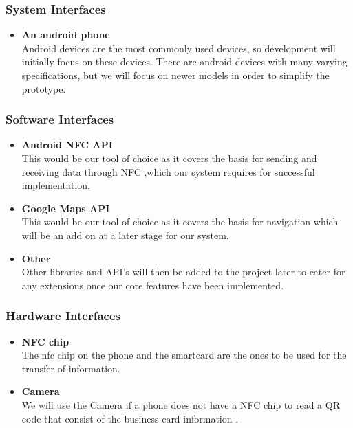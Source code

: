 \documentclass[english]{article}
\begin{document}
                                              \subsubsection{System Interfaces}
							\begin{itemize}
    						    \item \textbf{An android phone } \\
    						    Android devices are the most commonly used devices, so development will initially focus on these devices. There are android devices with many varying specifications, but we will focus on newer models in order to simplify the prototype. \\
    
    						\end{itemize}
                                               \subsubsection{Software Interfaces}
        					\begin{itemize}
        					    \item \textbf{Android NFC API}\\
        					    This would be our tool of choice as it covers the basis for sending and receiving data through NFC ,which our system requires for successful implementation.
						 \item \textbf{Google Maps API}\\
        					    This would be our tool of choice as it covers the basis for navigation which will be an add on at a later stage for our system.
        					    \item \textbf{Other}\\
        					    Other libraries and API's will then be added to the project later to cater for any extensions once our core features have been implemented.
        					\end{itemize}
                                              \subsubsection{Hardware Interfaces}
    						\begin{itemize}
						  \item \textbf{NFC chip} \\
						The nfc chip on the phone and the smartcard are the ones to be used for the transfer of information.
    						    \item \textbf{Camera} \\
    						    We will use the Camera if a phone does not have a NFC chip to read a QR code that consist of the business card information . \\
						\end{itemize}
\end{document}

